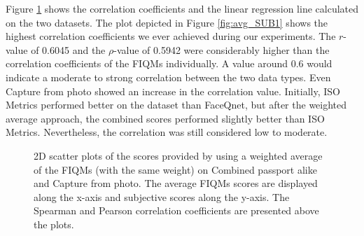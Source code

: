 Figure \ref{fig:corrAVGvsSub} shows the correlation coefficients and the linear regression line calculated on the two datasets. The plot depicted in Figure \ref{fig:avg_SUB1} shows the highest correlation coefficients we ever achieved during our experiments. The $r$-value of 0.6045 and the $\rho$-value of 0.5942 were considerably higher than the correlation coefficients of the FIQMs individually. A value around 0.6 would indicate a moderate to strong correlation between the two data types. Even Capture from photo showed an increase in the correlation value. Initially, ISO Metrics performed better on the dataset than FaceQnet, but after the weighted average approach, the combined scores performed slightly better than ISO Metrics. Nevertheless, the correlation was still considered low to moderate. 
\begin{figure}[h]
\centering
    \caption{2D scatter plots of the scores provided by using a weighted average of the FIQMs (with the same weight) on Combined passport alike and Capture from photo. The average FIQMs scores are displayed along the x-axis and subjective scores along the y-axis. The Spearman and Pearson correlation coefficients are presented above the plots.}
    \label{fig:corrAVGvsSub}
\end{figure}

